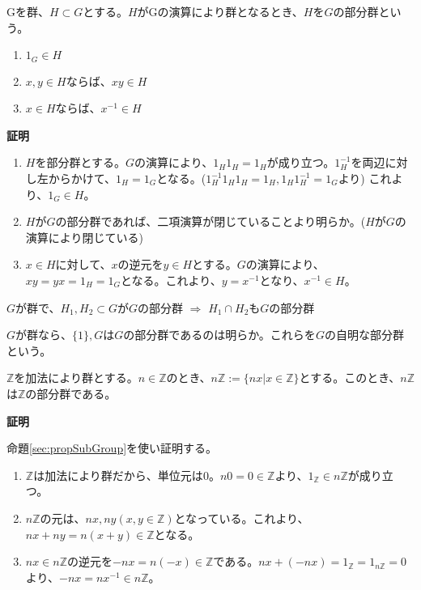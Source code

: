 \documentclass[dvipdfmx,autodetect-engine]{jsarticle}
\begin{document}
Gを群、$H \subset G$とする。$H$がGの演算により群となるとき、$H$を$G$の部分群という。

\label{sec:propSubGroup}

\begin{enumerate}
\renewcommand{\labelenumi}{(\arabic{enumi})}
\item $1_{G} \in H$
\item $x, y \in H$ならば、$xy \in H$
\item $x \in H$ならば、$x^{-1} \in H$
\end{enumerate}

{\bf 証明}

\begin{enumerate}
\renewcommand{\labelenumi}{(\arabic{enumi})}
\item $H$を部分群とする。$G$の演算により、$1_{H}1_{H} = 1_{H}$が成り立つ。$1_{H}^{-1}$を両辺に対し左からかけて、$1_{H} = 1_{G}$となる。($1_{H}^{-1}1_{H}1_{H} = 1_{H}, 1_{H}1_{H}^{-1} = 1_{G}$より)
これより、$1_{G} \in H$。

\item $H$が$G$の部分群であれば、二項演算が閉じていることより明らか。($H$が$G$の演算により閉じている)

\item $x \in H$に対して、$x$の逆元を$y \in H$とする。$G$の演算により、$xy = yx = 1_{H} = 1_{G}$となる。これより、$y = x^{-1}$となり、$x^{-1} \in H$。

\end{enumerate}

\prop $G$が群で、$H_{1}, H_{2} \subset G$が$G$の部分群 $\Rightarrow$ $H_{1} \cap H_{2}$も$G$の部分群


$G$が群なら、$\{1\}, G$は$G$の部分群であるのは明らか。これらを$G$の自明な部分群という。

\exam $\mathbb{Z}$を加法により群とする。$n \in \mathbb{Z}$のとき、$n \mathbb{Z} := \{nx | x \in \mathbb{Z} \}$とする。このとき、$n\mathbb{Z}$は$\mathbb{Z}$の部分群である。

{\bf 証明}

命題\ref{sec:propSubGroup}を使い証明する。

\begin{enumerate}
\renewcommand{\labelenumi}{(\arabic{enumi})}
\item $\mathbb{Z}$は加法により群だから、単位元は$0$。$n0 = 0 \in \mathbb{Z}$より、$1_{\mathbb{Z}} \in n\mathbb{Z}$が成り立つ。
\item $n\mathbb{Z}$の元は、$nx, ny (x, y \in \mathbb{Z})$となっている。これより、$nx + ny = n(x + y) \in \mathbb{Z}$となる。
\item $nx \in n\mathbb{Z}$の逆元を$-nx = n(-x) \in \mathbb{Z}$である。$nx + (-nx) = 1_{\mathbb{Z}} = 1_{n\mathbb{Z}} = 0$より、$-nx = nx^{-1} \in n\mathbb{Z}$。
\end{enumerate}
\end{document}
